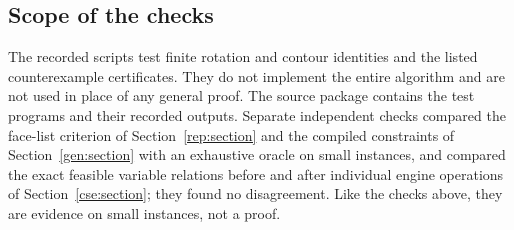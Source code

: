 \subsection{Scope of the checks}

The recorded scripts test finite rotation and contour identities and the
listed counterexample certificates.  They do not implement the entire
algorithm and are not used in place of any general proof.  The source
package contains the test programs and their recorded outputs.  Separate
independent checks compared the face-list criterion of
Section~\ref{rep:section} and the compiled constraints of
Section~\ref{gen:section} with an exhaustive \SEFE{} oracle on small
instances, and compared the exact feasible variable relations before and
after individual engine operations of Section~\ref{cse:section}; they
found no disagreement.  Like the checks above, they are evidence on small
instances, not a proof.
